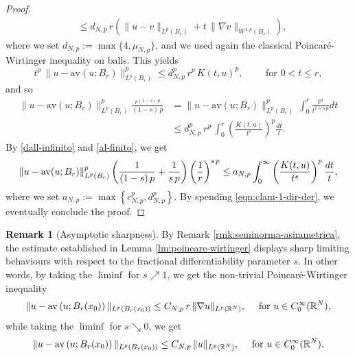 \documentclass{amsart}
\theoremstyle{definition}
\newtheorem{remark}[theorem]{Remark}
\numberwithin{equation}{section}
\begin{document}
\begin{proof}
\[\begin{split}
		&\le  d_{N,p}\,r\left(\|u-v\|_{L^p(B_r)} + t\,\|\nabla v\|_{W^{1,p}(B_r)}\right),
	\end{split}
	\]
	where we set $d_{N,p} := \max\{4, \mu_{N,p}\}$, and we used again the classical Poincar\'e-Wirtinger inequality on balls. This yields 
	\[
	t^p\,\|u - \mathrm{av}(u; B_r)\|^p_{L^p(B_r)} \le d_{N,p}^p\,r^{p}\,K(t,u)^p, \qquad \mbox{ for } 0 < t \le r, 
	\]
	and so 
	\begin{equation} \label{al-finito}
		\begin{split}
			\|u - \mathrm{av}(u; B_r)\|^p_{L^p(B_r)} \frac{r^{(1-s)\,p}}{(1-s)\,p} &= \|u - \mathrm{av}(u; B_r)\|^p_{L^p(B_r)}\,\int_{0}^{r} \frac{t^p}{t^{1+s\,p}}dt \\
			&\le d_{N,p}^p\,r^p\,\int_{0}^r \left(\frac{K(t, u)}{t^s}\right)^p \frac{dt}{t}. 
		\end{split}
	\end{equation}
	By \eqref{dall-infinito} and \eqref{al-finito}, we get
	\[
	\|u - {\rm av}(u; B_r)\|^p_{L^p(B_r)} \left(\frac{1}{(1-s)\,p} + \frac{1}{s\,p}\right) \left(\frac{1}{r}\right)^{s\,p} \le a_{N,p} \int_{0}^{\infty} \left(\frac{K(t, u)}{t^s}\right)^p \frac{dt}{t},
	\]  
	where we set $a_{N,p}:= \max\left\{c_{N,p}^p, d_{N,p}^p\right\}$. By spending \eqref{eqn:clam-1-dir-der}, we eventually conclude the proof. 
\end{proof}

\begin{remark}[Asymptotic sharpness]
	By Remark \ref{rmk:seminorma-asimmetrica}, the estimate established in Lemma \ref{lm:poincare-wirtinger} displays sharp limiting behaviours with respect to the fractional differentiability parameter $s$. In other words, by taking the $\liminf$ for $s \nearrow 1$, we get the non-trivial Poincar\'e-Wirtinger inequality 
	\[
	\|u - {\rm av}\left(u; B_r(x_0)\right)\|_{L^p(B_r(x_0))} \le C_{N,p}\,r\,\|\nabla u\|_{L^p(\mathbb{R}^N)}, \quad \mbox{ for } u \in C^\infty_0(\mathbb{R}^N),
	\] 
	while taking the $\liminf$ for $s \searrow 0$, we get
	\[
	\|u - {\rm av}\left(u; B_r(x_0)\right)\|_{L^p(B_r(x_0))} \le C_{N,p}\,\|u\|_{L^p(\mathbb{R}^N)}, \quad \mbox{ for } u \in C^\infty_0(\mathbb{R}^N).
	\] 
\end{remark}
\end{document}
